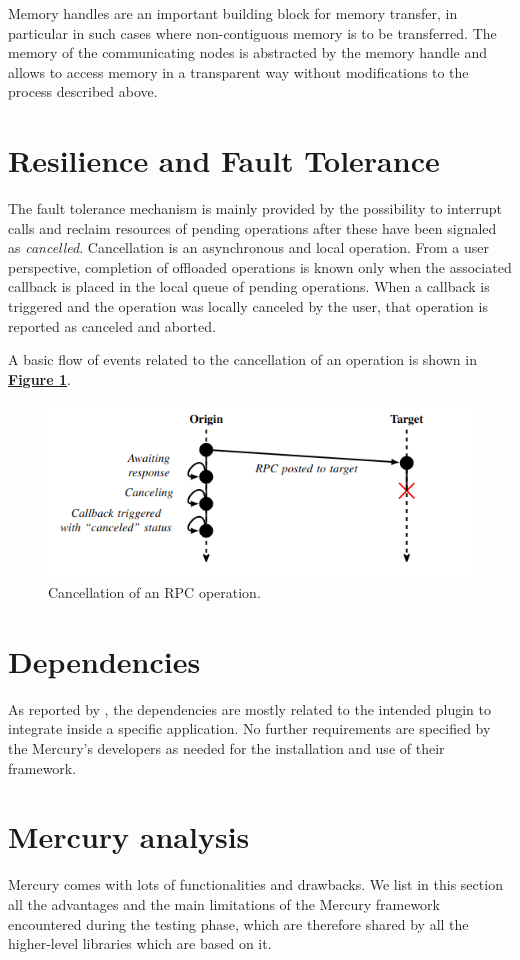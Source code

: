Memory handles are an important building block for memory transfer, in particular in such cases where non-contiguous memory is to be transferred. The memory of the communicating nodes is abstracted by the memory handle and allows to access memory in a transparent way without modifications to the process described above.

\section{Resilience and Fault Tolerance}
The fault tolerance mechanism is mainly provided by the possibility to interrupt calls and reclaim resources of pending operations after these have been signaled as \textit{cancelled}. Cancellation is an asynchronous and local operation. From a user perspective, completion of offloaded operations is known only when the associated callback is placed in the local queue of pending operations. When a callback is triggered and the operation was locally canceled by the user, that operation is reported as canceled and aborted.\newline

A basic flow of events related to the cancellation of an operation is shown in \hyperref[fig:op-cancel]{\textbf{Figure \ref{fig:op-cancel}}}.

\begin{figure}[H]
    \centering
    \includegraphics[width=0.6\linewidth]{res/op-cancel.png}
    \caption{Cancellation of an RPC operation.}
    \label{fig:op-cancel}
\end{figure}

\section{Dependencies}
As reported by \cite{merc_git}, the dependencies are mostly related to the intended plugin to integrate inside a specific application. No further requirements are specified by the Mercury's developers as needed for the installation and use of their framework.


\section{Mercury analysis}
\label{sec:mercury-analysis}
Mercury comes with lots of functionalities and drawbacks. We list in this section all the advantages and the main limitations of the Mercury framework encountered during the testing phase, which are therefore shared by all the higher-level libraries which are based on it.

